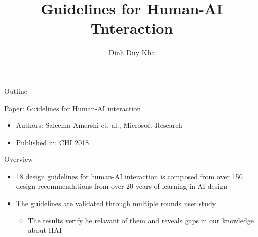 \documentclass[presentation]{beamer}
\author{Dinh Duy Kha}
\date{}
\title{Guidelines for Human-AI Tnteraction}
\begin{document}
\maketitle
\begin{frame}{Outline}
\tableofcontents
\end{frame}


\begin{frame}[label={sec:orga630056}]{Paper: Guidelines for Human-AI interaction}
\begin{itemize}
\item Authors: Saleema Amershi et. al., Microsoft Research
\item Published in: CHI 2018
\end{itemize}
\begin{block}{Overview}
\begin{itemize}
\item 18 design guidelines for human-AI interaction is composed from over 150 design recommendations from over 20 years of learning in AI design
\item The guidelines are validated through multiple rounds user study
\begin{itemize}
\item The results verify he relavant of them and reveals gaps in our knowledge about HAI
\end{itemize}
\end{itemize}
\end{block}
\end{frame}
\end{document}
